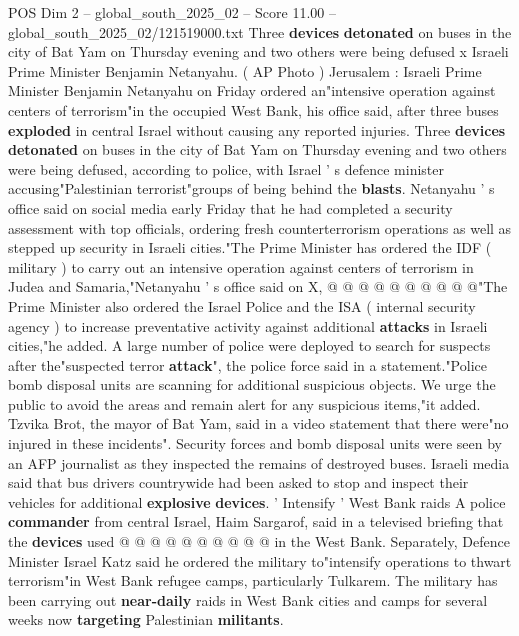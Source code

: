 \begin{textsample}{POS Dim 2 – global\_south\_2025\_02 – Score 11.00 – global\_south\_2025\_02/121519000.txt}  \label{ex:f2_pos_378}
Three \textbf{devices} \textbf{detonated} on buses in the city of Bat Yam on Thursday evening and two others were being defused x Israeli Prime Minister Benjamin Netanyahu. ( AP Photo ) Jerusalem : Israeli Prime Minister Benjamin Netanyahu on Friday ordered an"intensive operation against centers of terrorism"in the occupied West Bank, his office said, after three buses \textbf{exploded} in central Israel without causing any reported injuries.
Three \textbf{devices} \textbf{detonated} on buses in the city of Bat Yam on Thursday evening and two others were being defused, according to police, with Israel ' s defence minister accusing"Palestinian terrorist"groups of being behind the \textbf{blasts}.
Netanyahu ' s office said on social media early Friday that he had completed a security assessment with top officials, ordering fresh counterterrorism operations as well as stepped up security in Israeli cities."The Prime Minister has ordered the IDF ( military ) to carry out an intensive operation against centers of terrorism in Judea and Samaria,"Netanyahu ' s office said on X, @ @ @ @ @ @ @ @ @ @"The Prime Minister also ordered the Israel Police and the ISA ( internal security agency ) to increase preventative activity against additional \textbf{attacks} in Israeli cities,"he added.
A large number of police were deployed to search for suspects after the"suspected terror \textbf{attack}", the police force said in a statement."Police bomb disposal units are scanning for additional suspicious objects.
We urge the public to avoid the areas and remain alert for any suspicious items,"it added.
Tzvika Brot, the mayor of Bat Yam, said in a video statement that there were"no injured in these incidents".
Security forces and bomb disposal units were seen by an AFP journalist as they inspected the remains of destroyed buses.
Israeli media said that bus drivers countrywide had been asked to stop and inspect their vehicles for additional \textbf{explosive} \textbf{devices}. ' Intensify ' West Bank raids A police \textbf{commander} from central Israel, Haim Sargarof, said in a televised briefing that the \textbf{devices} used @ @ @ @ @ @ @ @ @ @ in the West Bank.
Separately, Defence Minister Israel Katz said he ordered the military to"intensify operations to thwart terrorism"in West Bank refugee camps, particularly Tulkarem.
The military has been carrying out \textbf{near-daily} raids in West Bank cities and camps for several weeks now \textbf{targeting} Palestinian \textbf{militants}.

\end{textsample}
